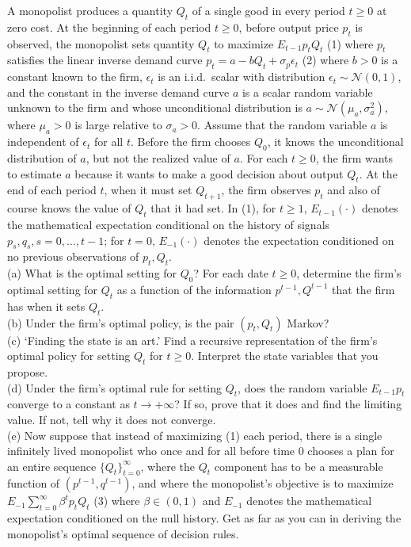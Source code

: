\documentclass[12pt, letterpaper]{article}
\begin{document}
\begin{tcolorbox}[oddbox,title={Exercise 2.23 \quad A Monopolist, Learning, and Ergodicity}]
\begin{tcolorbox}[questionbox]
A monopolist produces a quantity $Q_t$ of a single good in every period $t\ge0$ at zero cost. At the
beginning of each period $t\ge0$, before output price $p_t$ is observed, the monopolist sets quantity
$Q_t$ to maximize $E_{t-1}p_tQ_t$ (1) where $p_t$ satisfies the linear inverse demand curve
$p_t=a-bQ_t+\sigma_p\epsilon_t$ (2) where $b>0$ is a constant known to the firm, $\epsilon_t$ is an
i.i.d.\ scalar with distribution $\epsilon_t\sim\mathcal N(0,1)$, and the constant in the inverse demand
curve $a$ is a scalar random variable unknown to the firm and whose unconditional distribution is
$a\sim\mathcal N(\mu_a,\sigma_a^2)$, where $\mu_a>0$ is large relative to $\sigma_a>0$. Assume that the
random variable $a$ is independent of $\epsilon_t$ for all $t$. Before the firm chooses $Q_0$, it
knows the unconditional distribution of $a$, but not the realized value of $a$. For each $t\ge0$, the
firm wants to estimate $a$ because it wants to make a good decision about output $Q_t$. At the end of
each period $t$, when it must set $Q_{t+1}$, the firm observes $p_t$ and also of course knows the value
of $Q_t$ that it had set. In (1), for $t\ge1$, $E_{t-1}(\cdot)$ denotes the mathematical expectation
conditional on the history of signals $p_s,q_s,s=0,\dots,t-1$; for $t=0$, $E_{-1}(\cdot)$ denotes the
expectation conditioned on no previous observations of $p_t,Q_t$.\\[3pt]
(a) What is the optimal setting for $Q_0$? For each date $t\ge0$, determine the firm's optimal setting
for $Q_t$ as a function of the information $p^{t-1},Q^{t-1}$ that the firm has when it sets $Q_t$.\\
(b) Under the firm's optimal policy, is the pair $(p_t,Q_t)$ Markov?\\
(c) `Finding the state is an art.' Find a recursive representation of the firm's optimal policy for
setting $Q_t$ for $t\ge0$. Interpret the state variables that you propose.\\
(d) Under the firm's optimal rule for setting $Q_t$, does the random variable $E_{t-1}p_t$ converge to
a constant as $t\to+\infty$? If so, prove that it does and find the limiting value. If not, tell why
it does not converge.\\
(e) Now suppose that instead of maximizing (1) each period, there is a single infinitely lived
monopolist who once and for all before time 0 chooses a plan for an entire sequence
$\{Q_t\}_{t=0}^\infty$, where the $Q_t$ component has to be a measurable function of
$(p^{t-1},q^{t-1})$, and where the monopolist's objective is to maximize
$E_{-1}\sum_{t=0}^\infty\beta^tp_tQ_t$ (3) where $\beta\in(0,1)$ and $E_{-1}$ denotes the mathematical
expectation conditioned on the null history. Get as far as you can in deriving the monopolist's
optimal sequence of decision rules.
\end{tcolorbox}


\end{tcolorbox}
\end{document}
